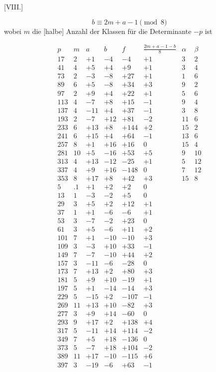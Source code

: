 \clearpage
{}
\par\bigskip{}\centerline{[VIII.]}\medskip
\[
b\equiv2m+a-1\pmod8
\]
wobei $m$ die [halbe] Anzahl der Klassen für die Determinante $-p$ ist

\begingroup\small
\[
\begin{array}{r|r|r|r|r|r|r|r}
p&m&a&b&f&\frac{2m+a-1-b}8&\alpha&\beta\\\hline
17&2&+1&-4&-4&+1&3&2\\
41&4&+5&+4&+9&+1&3&4\\
73&2&-3&-8&+27&+1&1&6\\
89&6&+5&-8&+34&+3&9&2\\
97&2&+9&+4&+22&+1&5&6\\
113&4&-7&+8&+15&-1&9&4\\
137&4&-11&+4&+37&-1&3&8\\
193&2&-7&+12&+81&-2&11&6\\
233&6&+13&+8&+144&+2&15&2\\
241&6&+15&+4&+64&-1&13&6\\
257&8&+1&+16&+16&0&15&4\\
281&10&+5&-16&+53&+5&9&10\\
313&4&+13&-12&-25&+1&5&12\\
337&4&+9&+16&-148&0&7&12\\
353&8&+17&+8&+42&+3&15&8\\
5&.1&+1&+2&+2&0&&\\
13&1&-3&-2&+5&0&&\\
29&3&+5&+2&+12&+1&&\\
37&1&+1&-6&-6&+1&&\\
53&3&-7&-2&+23&0&&\\
61&3&+5&-6&+11&+2&&\\
101&7&+1&-10&-10&+3&&\\
109&3&-3&+10&+33&-1&&\\
149&7&-7&-10&+44&+2&&\\
157&3&-11&-6&-28&0&&\\
173&7&+13&+2&+80&+3&&\\
181&5&+9&+10&-19&+1&&\\
197&5&+1&-14&-14&+3&&\\
229&5&-15&+2&-107&-1&&\\
269&11&+13&+10&-82&+3&&\\
277&3&+9&+14&-60&0&&\\
293&9&+17&+2&+138&+4&&\\
317&5&-11&+14&+114&-2&&\\
349&7&+5&+18&-136&0&&\\
373&5&-7&+18&+104&-2&&\\
389&11&+17&-10&-115&+6&&\\
397&3&-19&-6&+63&-1&&
\end{array}
\]
\endgroup
{}
